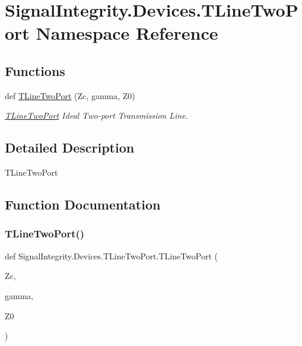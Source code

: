 \hypertarget{namespaceSignalIntegrity_1_1Devices_1_1TLineTwoPort}{}\section{Signal\+Integrity.\+Devices.\+T\+Line\+Two\+Port Namespace Reference}
\label{namespaceSignalIntegrity_1_1Devices_1_1TLineTwoPort}
\subsection*{Functions}
\begin{DoxyCompactItemize}
\item 
def \hyperlink{namespaceSignalIntegrity_1_1Devices_1_1TLineTwoPort_a7bd18f7b4b86ece0e8648407add746d4}{T\+Line\+Two\+Port} (Zc, gamma, Z0)
\begin{DoxyCompactList}\small\item\em \hyperlink{namespaceSignalIntegrity_1_1Devices_1_1TLineTwoPort}{T\+Line\+Two\+Port} Ideal Two-\/port Transmission Line. \end{DoxyCompactList}\end{DoxyCompactItemize}


\subsection{Detailed Description}
\begin{DoxyVerb}TLineTwoPort\end{DoxyVerb}
 

\subsection{Function Documentation}
\mbox{\label{namespaceSignalIntegrity_1_1Devices_1_1TLineTwoPort_a7bd18f7b4b86ece0e8648407add746d4}} 
\subsubsection{\texorpdfstring{T\+Line\+Two\+Port()}{TLineTwoPort()}}
{\footnotesize\ttfamily def Signal\+Integrity.\+Devices.\+T\+Line\+Two\+Port.\+T\+Line\+Two\+Port (\begin{DoxyParamCaption}\item[{}]{Zc,  }\item[{}]{gamma,  }\item[{}]{Z0 }\end{DoxyParamCaption})}



